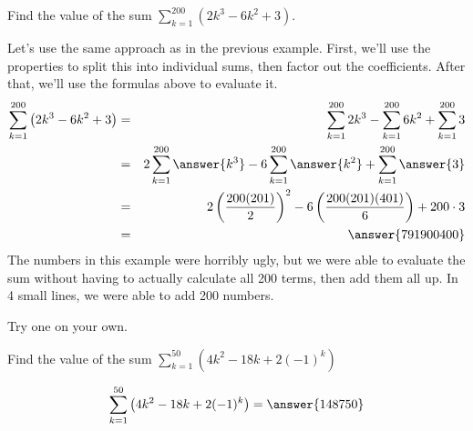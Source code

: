 \documentclass{ximera}
\begin{document}
\begin{example}
	Find the value of the sum $\displaystyle \sum_{k=1}^{200} \left(2k^3-6k^2+3\right)$.
	\begin{explanation}
		Let's use the same approach as in the previous example.  First, we'll use the properties to split this into individual sums, then factor out the coefficients.  
		After that, we'll use the formulas above to evaluate it.
		\begin{eqnarray*}
			\sum_{k=1}^{200} \left(2k^3-6k^2+3\right) &=& \sum_{k=1}^{200} 2k^3 - \sum_{k=1}^{200} 6k^2 + \sum_{k=1}^{200}3\\
				&=& 2 \sum_{k=1}^{200} \answer{k^3} - 6 \sum_{k=1}^{200} \answer{k^2} + \sum_{k=1}^{200}\answer{3}\\
				&=& 2 \left( \frac{200(201)}{2}\right)^2 - 6 \left( \frac{200(201)(401)}{6}\right) + 200 \cdot 3\\
				&=& \answer{791900400}
		\end{eqnarray*}
	The numbers in this example were horribly ugly, but we were able to evaluate the sum without having to actually calculate all 200 terms, then add them all up.
	In 4 small lines, we were able to add 200 numbers.
	
	\end{explanation}
\end{example}

 

Try one on your own.
\begin{problem}
	Find the value of the sum $\displaystyle \sum_{k=1}^{50} \left( 4k^2-18k + 2(-1)^k \right)$
	
	\[ \sum_{k=1}^{50} \left( 4k^2 - 18k + 2(-1)^k \right) = \answer{148750} \]
\end{problem}
  
\end{document}
